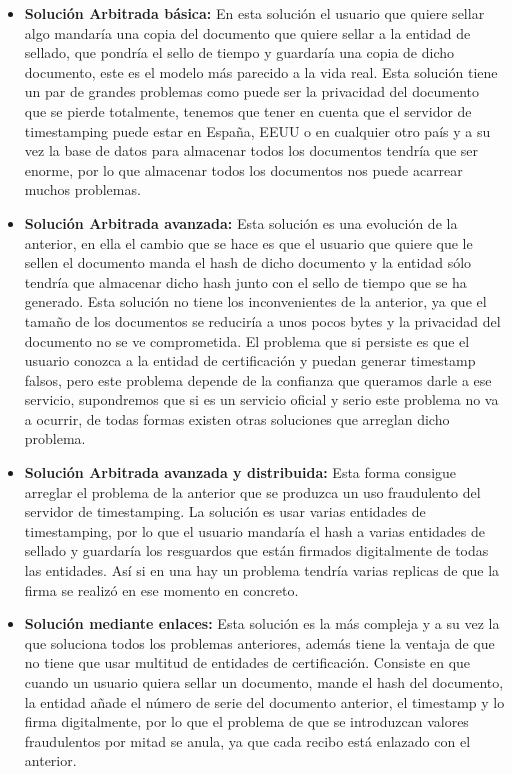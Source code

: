 \begin{itemize}

\item \textbf{Solución Arbitrada básica:} En esta solución el usuario que quiere sellar algo mandaría una copia del documento que quiere sellar a la entidad de sellado, que pondría el sello de tiempo y guardaría una copia de dicho documento, este es el modelo más parecido a la vida real. Esta solución tiene un par de grandes problemas como puede ser la privacidad del documento que se pierde totalmente, tenemos que tener en cuenta que el servidor de timestamping puede estar en España, EEUU o en cualquier otro país y a su vez la base de datos para almacenar todos los documentos tendría que ser enorme, por lo que almacenar todos los documentos nos puede acarrear muchos problemas.

\item \textbf{Solución Arbitrada avanzada:} Esta solución es una evolución de la anterior, en ella el cambio que se hace es que el usuario que quiere que le sellen el documento manda el hash de dicho documento y la entidad sólo tendría que almacenar dicho hash junto con el sello de tiempo que se ha generado. Esta solución no tiene los inconvenientes de la anterior, ya que el tamaño de los documentos se reduciría a unos pocos bytes y la privacidad del documento no se ve comprometida. El problema que si persiste es que el usuario conozca a la entidad de certificación y puedan generar timestamp falsos, pero este problema depende de la confianza que queramos darle a ese servicio, supondremos que si es un servicio oficial y serio este problema no va a ocurrir, de todas formas existen otras soluciones que arreglan dicho problema.

\item \textbf{Solución Arbitrada avanzada y distribuida:} Esta forma consigue arreglar el problema de la anterior que se produzca un uso fraudulento del servidor de timestamping. La solución es usar varias entidades de timestamping, por lo que el usuario mandaría el hash a varias entidades de sellado y guardaría los resguardos que están firmados digitalmente de todas las entidades. Así si en una hay un problema tendría varias replicas de que la firma se realizó en ese momento en concreto.

\item \textbf{Solución mediante enlaces:} Esta solución es la más compleja y a su vez la que soluciona todos los problemas anteriores, además tiene la ventaja de que no tiene que usar multitud de entidades de certificación. Consiste en que cuando un usuario quiera sellar un documento, mande el hash del documento, la entidad añade el número de serie del documento anterior, el timestamp y lo firma digitalmente, por lo que el problema de que se introduzcan valores fraudulentos por mitad se anula, ya que cada recibo está enlazado con el anterior.
\end{itemize}

